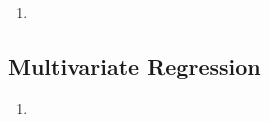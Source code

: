 \documentclass[a4paper,12pt]{article}
\begin{document}
\begin{enumerate}

\item 

\end{enumerate}

\subsection{Multivariate Regression}

\begin{enumerate}

\item 







\end{enumerate}
\end{document}
